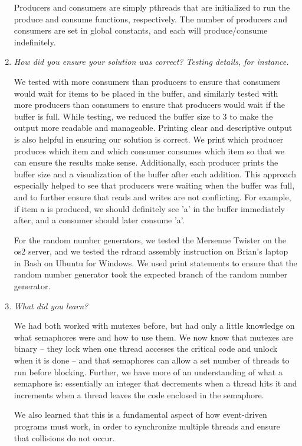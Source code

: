 \documentclass[letterpaper, onecolumn, draftclsnofoot, 10pt, compsoc]{IEEEtran}
\begin{document}
\begin{singlespace}
\begin{enumerate}
            Producers and consumers are simply pthreads that are initialized to run the produce and consume functions, respectively. The number of producers and consumers are set in global constants, and each will produce/consume indefinitely. 
            \par
            \item \textit{How did you ensure your solution was correct? Testing details, for instance.}\par
            We tested with more consumers than producers to ensure that consumers would wait for items to be placed in the buffer, and similarly tested with more producers than consumers to ensure that producers would wait if the buffer is full. While testing, we reduced the buffer size to 3 to make the output more readable and manageable.
            \newline
            Printing clear and descriptive output is also helpful in ensuring our solution is correct. We print which producer produces which item and which consumer consumes which item so that we can ensure the results make sense. Additionally, each producer prints the buffer size and a visualization of the buffer after each addition. This approach especially helped to see that producers were waiting when the buffer was full, and to further ensure that reads and writes are not conflicting. For example, if item a is produced, we should definitely see 'a' in the buffer immediately after, and a consumer should later consume 'a'.
            \par
            For the random number generators, we tested the Mersenne Twister on the os2 server, and we tested the rdrand assembly instruction on Brian's laptop in Bash on Ubuntu for Windows. We used print statements to ensure that the random number generator took the expected branch of the random number generator.
            \item \textit{What did you learn?}\par
            We had both worked with mutexes before, but had only a little knowledge on what semaphores were and how to use them. We now know that mutexes are binary -- they lock when one thread accesses the critical code and unlock when it is done -- and that semaphores can allow a set number of threads to run before blocking. Further, we have more of an understanding of what a semaphore is: essentially an integer that decrements when a thread hits it and increments when a thread leaves the code enclosed in the semaphore.
            
            We also learned that this is a fundamental aspect of how event-driven programs must work, in order to synchronize multiple threads and ensure that collisions do not occur.
            \par
        \end{enumerate}
    \end{singlespace}
\end{document}
